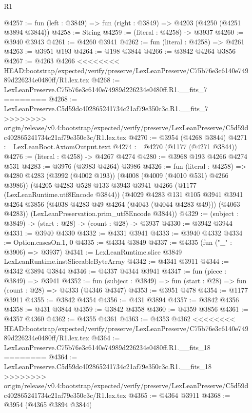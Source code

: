 \begin{lexlean}{R1}
\begin{coremodule}
{{{{{{{{{{{{{{{{{{{{{{{{{{{{{{{{{{{{{{{{{{{{{{{{{{{{{{{{{{{{{{{{{{{{{{{{{{{{{{{{{{{{{{{{{{{{{{{{{{{{{{{{{{{{{{{{{{{{{{{{{{{{{{{{{{{{{{{{{{{{{{{{{{{{{{{{{{{{{{{{{{{{{{{{{{{{{{{{{{{{{{{{{{@4257 := fun (left : @3849) => fun (right : @3849) => @4203 (@4250 (@4251 @3894 @3844))
@4258 := String
@4259 := (literal : @4258) -> @3937
@4260 := @3940 @3943
@4261 := @4260 @3941
@4262 := fun (literal : @4258) => @4261
@4263 := @3951 @193
@4264 := @198 @3844
@4266 := @3842 @4264 @3856
@4267 := @4263 @4266
<<<<<<<< HEAD:bootstrap/expected/verify/preserve/LexLeanPreserve/C75b76e3c6140e74989d226234e0480ff/R1.lex.tex
@4268 := LexLeanPreserve.C75b76e3c6140e74989d226234e0480ff.R1.__fits_7
========
@4268 := LexLeanPreserve.C5d59dc402865241734c21af79e350c3c.R1.__fits_7
>>>>>>>> origin/release/v0.4:bootstrap/expected/verify/preserve/LexLeanPreserve/C5d59dc402865241734c21af79e350c3c/R1.lex.tex
@4270 := @3954 (@4268 @3844)
@4271 := LexLeanBoot.AxiomOutput.text
@4274 := @4270 (@1177 (@4271 @3844))
@4276 := (literal : @4258) -> @4267 @4274
@4280 := @3968 @193 @4266 @4274 @531
@4283 := @3976 (@3983 @4264) @3986
@4326 := fun (literal : @4258) =>
  @4280
    @4283
    (@3992 (@4002 @193))
    (@4008 (@4009 (@4010 @531) @4266 @3986))
    (@4205
      @4283
      @528
      @133
      @3943
      @3941
      @4266
      (@1177 (LexLeanRuntime.utf8Encode @3844))
      (@4029
        @4283
        @131
        @105
        @3941
        @3941
        @4264
        @3856
        (@4038 @4283 @49 @4264 (@4043 (@4044 @4283 @49)))
        (@4063 @4283))
      (LexLeanPreservation.prim_utf8Encode @3844))
@4329 := (subject : @3849) -> (start : @28) -> (count : @28) -> @3937
@4330 := @3942 @3944
@4331 := @3940 @4330
@4332 := @4331 @3941
@4333 := @3940 @4332
@4334 := Option.casesOn.{1, 0}
@4335 := @4334 @3849
@4337 := @4335 (fun ("_" : @3906) => @3937)
@4341 := LexLeanRuntime.slice @3849 LexLeanRuntime.instSliceableByteArray
@4342 := @4341 @3911
@4344 := @4342 @3894 @3844
@4346 := @4337 @4344 @3941
@4347 := fun (piece : @3849) => @3941
@4352 := fun (subject : @3849) => fun (start : @28) => fun (count : @28) => @4333 (@4346 @4347)
@4353 := @3951 @478
@4354 := @1177 @3911
@4355 := @3842 @4354
@4356 := @431 @3894
@4357 := @3842 @4356
@4358 := @431 @3844
@4359 := @3842 @4358
@4360 := @4359 @3856
@4361 := @4357 @4360
@4362 := @4355 @4361
@4363 := @4353 @4362
<<<<<<<< HEAD:bootstrap/expected/verify/preserve/LexLeanPreserve/C75b76e3c6140e74989d226234e0480ff/R1.lex.tex
@4364 := LexLeanPreserve.C75b76e3c6140e74989d226234e0480ff.R1.__fits_18
========
@4364 := LexLeanPreserve.C5d59dc402865241734c21af79e350c3c.R1.__fits_18
>>>>>>>> origin/release/v0.4:bootstrap/expected/verify/preserve/LexLeanPreserve/C5d59dc402865241734c21af79e350c3c/R1.lex.tex
@4365 := @4364 @3911
@4368 := @3954 (@4365 @3894 @3844)
}}}}}}}}}}}}}}}}}}}}}}}}}}}}}}}}}}}}}}}}}}}}}}}}}}}}}}}}}}}}}}}}}}}}}}}}}}}}}}}}}}}}}}}}}}}}}}}}}}}}}}}}}}}}}}}}}}}}}}}}}}}}}}}}}}}}}}}}}}}}}}}}}}}}}}}}}}}}}}}}}}}}}}}}}}}}}}}}}}}}}}}}}}
\end{coremodule}
\end{lexlean}
